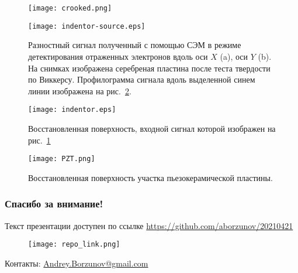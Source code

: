 \documentclass{beamer}
\begin{document}
\begin{frame}[c,allowframebreaks]
\framebreak

    \begin{figure}[ht]
        \texttt{[image: crooked.png]}
    \end{figure}

\framebreak

    \begin{figure}
        \texttt{[image: indentor-source.eps]}
        \caption{Разностный сигнал полученный с помощью СЭМ в режиме детектирования отраженных
            электронов вдоль оси $X$ (a), оси $Y$ (b). На снимках изображена серебреная пластина
            после теста твердости по Виккерсу. Профилограмма сигнала вдоль выделенной синем линии
        изображена на рис.~\ref{fig:indentor}.}%
        \label{fig:indentor-source}
    \end{figure}

\framebreak

    \begin{figure}
        \texttt{[image: indentor.eps]}
        \caption{Восстановленная поверхность, входной сигнал которой изображен на
        рис.~\ref{fig:indentor-source}}
        {\label{fig:indentor}}%
    \end{figure}

\framebreak

    \begin{figure}[ht]
        \texttt{[image: PZT.png]}
        \caption{Восстановленная поверхность участка пьезокерамической пластины.}
    \end{figure}


\end{frame}

\begin{frame}[c,allowframebreaks]
    
\end{frame}

\begin{frame}[c]
    \frametitle{Спасибо за внимание!}
    Текст презентации доступен по ссылке
    \url{https://github.com/aborzunov/20210421}
    \begin{figure}
        \texttt{[image: repo\_link.png]}
    \end{figure}
     Контакты: \url{Andrey.Borzunov@gmail.com}
\end{frame}
\end{document}
